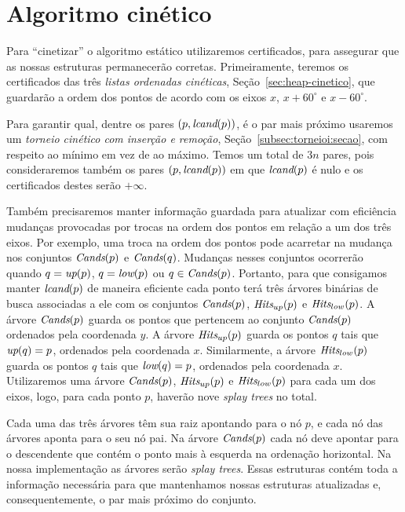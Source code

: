
\FloatBarrier


\section{Algoritmo cinético}\label{sec:algoritmo-cinetico}

Para ``cinetizar'' o algoritmo estático utilizaremos certificados, para assegurar que as nossas
estruturas permanecerão corretas.
Primeiramente, teremos os certificados das três \textit{listas ordenadas cinéticas},
Seção~\ref{sec:heap-cinetico}, que guardarão a ordem dos pontos de acordo com os eixos $x$, $x +
60^\circ$ e $x - 60^\circ$.

Para garantir qual, dentre os pares $(p, \textit{lcand}(p))$, é o par mais próximo usaremos um
\textit{torneio cinético com inserção e remoção}, Seção~\ref{subsec:torneioi:secao}, com respeito
ao mínimo em vez de ao máximo.
Temos um total de $3n$ pares, pois consideraremos também os pares $(p, \textit{lcand}(p))$ em que
$\textit{lcand}(p)$ é nulo e os certificados destes serão $+\infty$.

Também precisaremos manter informação guardada para atualizar com eficiência mudanças provocadas
por trocas na ordem dos pontos em relação a um dos três eixos.
Por exemplo, uma troca na ordem dos pontos pode acarretar na mudança nos conjuntos $\textit{Cands}(p)$ e
$\textit{Cands}(q)$.
Mudanças nesses conjuntos ocorrerão quando $q = \textit{up}(p)$, $q = \textit{low}(p)$ ou $q \in \textit{Cands}(p)$.
Portanto, para que consigamos manter $\textit{lcand}(p)$ de maneira eficiente cada ponto terá três árvores
binárias de busca associadas a ele com os conjuntos $\textit{Cands}(p)$, $\textit{Hits}_{up}(p)$ e $\textit{Hits}_{low}(p)
$.
A árvore $\textit{Cands}(p)$ guarda os pontos que pertencem ao conjunto $\textit{Cands}(p)$ ordenados pela
coordenada $y$.
A árvore $\textit{Hits}_{up}(p)$ guarda os pontos $q$ tais que $\textit{up}(q) = p$, ordenados pela coordenada $x$.
Similarmente, a árvore $\textit{Hits}_{low}(p)$ guarda os pontos $q$ tais que $\textit{low}(q) = p$, ordenados
pela coordenada $x$.
Utilizaremos uma árvore $\textit{Cands}(p)$, $\textit{Hits}_{up}(p)$ e $\textit{Hits}_{low}(p)$ para cada um dos eixos,
logo, para cada ponto $p$, haverão nove \textit{splay trees} no total.

Cada uma das três árvores têm sua raiz apontando para o nó $p$, e cada nó das árvores aponta para
o seu nó pai.
Na árvore $\textit{Cands}(p)$ cada nó deve apontar para o descendente que contém o ponto mais à esquerda
na ordenação horizontal.
Na nossa implementação as árvores serão \textit{splay trees}.
Essas estruturas contém toda a informação necessária para que mantenhamos nossas estruturas
atualizadas e, consequentemente, o par mais próximo do conjunto.

